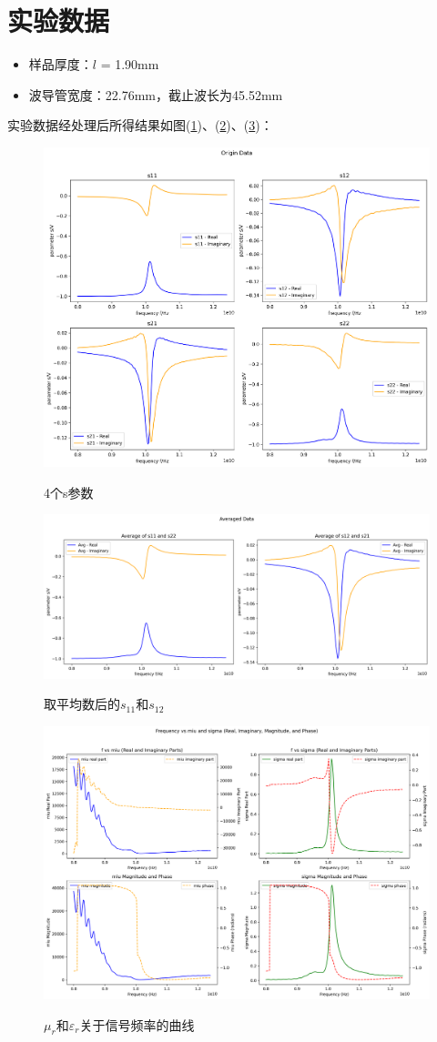 \documentclass[a4paper]{article}
\begin{document}
\section{实验数据}
\begin{itemize}
\item 样品厚度：$l$ = 1.90mm
\item 波导管宽度：22.76mm，截止波长为45.52mm
\end{itemize}
实验数据经处理后所得结果如图(\ref{sPara})、(\ref{sssa})、(\ref{final})：
\begin{figure}[!h]
\centering
\includegraphics[width=12cm]{data/img1.png}\\
\caption{4个s参数}\label{sPara}
\end{figure}
\begin{figure}[!h]
\centering
\includegraphics[width=12cm]{data/img2.png}\\
\caption{取平均数后的$s_{11}$和$s_{12}$}\label{sssa}
\end{figure}
\begin{figure}[!h]
\centering
\includegraphics[width=12cm]{data/img3.png}\\
\caption{$\mu_r$和$\varepsilon_r$关于信号频率的曲线}\label{final}
\end{figure}

\nocite{jiaocai}

\end{document}
